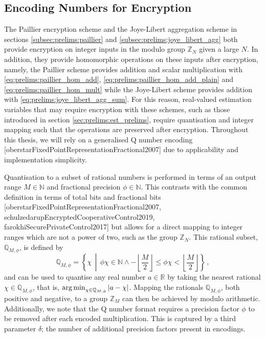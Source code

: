 % 
% 

\subsection{Encoding Numbers for Encryption}\label{subsec:prelims:encoding}
The Paillier encryption scheme and the Joye-Libert aggregation scheme in sections \ref{subsec:prelims:paillier} and \ref{subsec:prelims:joye_libert_agg} both provide encryption on integer inputs in the modulo group $\mathbb{Z}_N$ given a large $N$. In addition, they provide homomorphic operations on these inputs after encryption, namely, the Paillier scheme provides addition and scalar multiplication with \eqref{eq:prelims:paillier_hom_add}, \eqref{eq:prelims:paillier_hom_add_plain} and \eqref{eq:prelims:paillier_hom_mult} while the Joye-Libert scheme provides addition with \eqref{eq:prelims:joye_libert_agg_sum}. For this reason, real-valued estimation variables that may require encryption with these schemes, such as those introduced in section \ref{sec:prelims:est_prelims}, require quantisation and integer mapping such that the operations are preserved after encryption. Throughout this thesis, we will rely on a generalised Q number encoding [oberstarFixedPointRepresentationFractional2007] due to applicability and implementation simplicity.

Quantisation to a subset of rational numbers is performed in terms of an output range $M \in \mathbb{N}$ and fractional precision $\phi \in \mathbb{N}$. This contrasts with the common definition in terms of total bits and fractional bits [oberstarFixedPointRepresentationFractional2007, schulzedarupEncryptedCooperativeControl2019, farokhiSecurePrivateControl2017] but allows for a direct mapping to integer ranges which are not a power of two, such as the group $\mathbb{Z}_N$. This rational subset, $\mathbb{Q}_{M,\phi}$, is defined by
\begin{equation}
    \mathbb{Q}_{M,\phi} = \left\{\chi \,\middle|\, \phi \chi \in \mathbb{N} \wedge -\left\lfloor\frac{M}{2}\right\rfloor \leq \phi \chi < \left\lfloor\frac{M}{2}\right\rfloor \right\}\,,
\end{equation}
and can be used to quantise any real number $a \in \mathbb{R}$ by taking the nearest rational $\chi \in \mathbb{Q}_{M,\phi}$, that is, $\operatorname*{arg\,min}_{\chi\in\mathbb{Q}_{M,\phi}} |a-\chi|$. Mapping the rationals $\mathbb{Q}_{M,\phi}$, both positive and negative, to a group $\mathbb{Z}_M$ can then be achieved by modulo arithmetic. Additionally, we note that the Q number format requires a precision factor $\phi$ to be removed after each encoded multiplication. This is captured by a third parameter $\delta$; the number of additional precision factors present in encodings.

